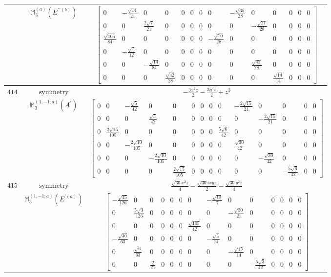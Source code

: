 \documentclass[fleqn,8pt,landscape]{jsarticle}
\begin{document}
\begin{longtable}{ccc}
$  $ & $ \mathbb{M}_{3}^{(a)}(E^{\prime\prime(b)}) $ & $ \begin{bmatrix} 0 & - \frac{\sqrt{14}}{21} & 0 & 0 & 0 & 0 & 0 & 0 & - \frac{\sqrt{35}}{28} & 0 & 0 & 0 & 0 & 0 \\ 0 & 0 & \frac{2 \sqrt{7}}{21} & 0 & 0 & 0 & 0 & 0 & 0 & - \frac{\sqrt{21}}{28} & 0 & 0 & 0 & 0 \\ \frac{\sqrt{105}}{84} & 0 & 0 & 0 & 0 & 0 & 0 & - \frac{\sqrt{70}}{28} & 0 & 0 & 0 & 0 & 0 & 0 \\ 0 & - \frac{\sqrt{7}}{12} & 0 & 0 & 0 & 0 & 0 & 0 & 0 & 0 & 0 & 0 & 0 & 0 \\ 0 & 0 & - \frac{\sqrt{14}}{84} & 0 & 0 & 0 & 0 & 0 & 0 & \frac{\sqrt{42}}{28} & 0 & 0 & 0 & 0 \\ 0 & 0 & 0 & \frac{\sqrt{42}}{28} & 0 & 0 & 0 & 0 & 0 & 0 & \frac{\sqrt{14}}{14} & 0 & 0 & 0 \end{bmatrix} $ \\ \hline
$ 414 $ & $ \text{symmetry} $ & $ - \frac{3 x^{2} z}{2} - \frac{3 y^{2} z}{2} + z^{3} $ \\
$  $ & $ \mathbb{M}_{3}^{(1,-1;a)}(A^{\prime}) $ & $ \begin{bmatrix} 0 & 0 & - \frac{\sqrt{5}}{42} & 0 & 0 & 0 & 0 & 0 & 0 & - \frac{2 \sqrt{15}}{21} & 0 & 0 & 0 & 0 \\ 0 & 0 & 0 & \frac{\sqrt{5}}{42} & 0 & 0 & 0 & 0 & 0 & 0 & - \frac{2 \sqrt{15}}{21} & 0 & 0 & 0 \\ 0 & \frac{2 \sqrt{15}}{105} & 0 & 0 & 0 & 0 & 0 & 0 & \frac{5 \sqrt{6}}{42} & 0 & 0 & 0 & 0 & 0 \\ 0 & 0 & - \frac{2 \sqrt{10}}{105} & 0 & 0 & 0 & 0 & 0 & 0 & \frac{\sqrt{30}}{42} & 0 & 0 & 0 & 0 \\ 0 & 0 & 0 & - \frac{2 \sqrt{10}}{105} & 0 & 0 & 0 & 0 & 0 & 0 & - \frac{\sqrt{30}}{42} & 0 & 0 & 0 \\ 0 & 0 & 0 & 0 & \frac{2 \sqrt{15}}{105} & 0 & 0 & 0 & 0 & 0 & 0 & - \frac{5 \sqrt{6}}{42} & 0 & 0 \end{bmatrix} $ \\ \hline
$ 415 $ & $ \text{symmetry} $ & $ \frac{\sqrt{30} x^{2} z}{4} - \frac{\sqrt{30} i x y z}{2} - \frac{\sqrt{30} y^{2} z}{4} $ \\
$  $ & $ \mathbb{M}_{3}^{(1,-1;a)}(E^{\prime(a)}) $ & $ \begin{bmatrix} - \frac{\sqrt{15}}{126} & 0 & 0 & 0 & 0 & 0 & 0 & - \frac{\sqrt{10}}{7} & 0 & 0 & 0 & 0 & 0 & 0 \\ 0 & \frac{5 \sqrt{3}}{126} & 0 & 0 & 0 & 0 & 0 & 0 & - \frac{\sqrt{30}}{21} & 0 & 0 & 0 & 0 & 0 \\ 0 & 0 & 0 & 0 & 0 & 0 & \frac{\sqrt{105}}{42} & 0 & 0 & 0 & 0 & 0 & 0 & 0 \\ - \frac{\sqrt{30}}{63} & 0 & 0 & 0 & 0 & 0 & 0 & - \frac{\sqrt{5}}{14} & 0 & 0 & 0 & 0 & 0 & 0 \\ 0 & \frac{\sqrt{6}}{63} & 0 & 0 & 0 & 0 & 0 & 0 & - \frac{\sqrt{15}}{14} & 0 & 0 & 0 & 0 & 0 \\ 0 & 0 & \frac{2}{21} & 0 & 0 & 0 & 0 & 0 & 0 & - \frac{5 \sqrt{3}}{42} & 0 & 0 & 0 & 0 \end{bmatrix} $ \\ \hline

\end{longtable}
\end{document}
